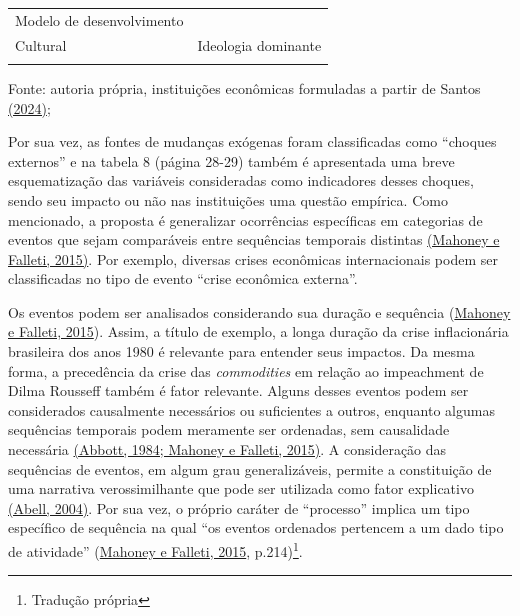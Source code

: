 \begin{longtable}[]{@{}
  >{\raggedright\arraybackslash}p{}
  >{\raggedright\arraybackslash}p{}@{}}
\begin{minipage}[b]{\linewidth}
Modelo de desenvolvimento
\end{minipage} \\
\begin{minipage}[b]{\linewidth}\raggedright
Cultural
\end{minipage} & \begin{minipage}[b]{\linewidth}\raggedright
Ideologia dominante
\end{minipage} \\
\midrule\noalign{}
\endhead
\bottomrule\noalign{}
\endlastfoot
\end{longtable}

Fonte: autoria própria, instituições econômicas formuladas a partir de
Santos \href{https://www.zotero.org/google-docs/?nTDqQq}{(2024)};

Por sua vez, as fontes de mudanças exógenas foram classificadas como
``choques externos'' e na tabela 8 (página 28-29) também é apresentada
uma breve esquematização das variáveis consideradas como indicadores
desses choques, sendo seu impacto ou não nas instituições uma questão
empírica. Como mencionado, a proposta é generalizar ocorrências
específicas em categorias de eventos que sejam comparáveis entre
sequências temporais distintas
\href{https://www.zotero.org/google-docs/?z1RPGn}{(Mahoney e Falleti,
2015)}. Por exemplo, diversas crises econômicas internacionais podem ser
classificadas no tipo de evento ``crise econômica externa''.

Os eventos podem ser analisados considerando sua duração e sequência
(\href{https://www.zotero.org/google-docs/?r6ykAY}{Mahoney e Falleti,
2015}). Assim, a título de exemplo, a longa duração da crise
inflacionária brasileira dos anos 1980 é relevante para entender seus
impactos. Da mesma forma, a precedência da crise das \emph{commodities}
em relação ao impeachment de Dilma Rousseff também é fator relevante.
Alguns desses eventos podem ser considerados causalmente necessários ou
suficientes a outros, enquanto algumas sequências temporais podem
meramente ser ordenadas, sem causalidade necessária
\href{https://www.zotero.org/google-docs/?ECkTS3}{(Abbott, 1984; Mahoney
e Falleti, 2015)}. A consideração das sequências de eventos, em algum
grau generalizáveis, permite a constituição de uma narrativa
verossimilhante que pode ser utilizada como fator explicativo
\href{https://www.zotero.org/google-docs/?93FtLL}{(Abell, 2004)}. Por
sua vez, o próprio caráter de ``processo'' implica um tipo específico de
sequência na qual ``os eventos ordenados pertencem a um dado tipo de
atividade'' (\href{https://www.zotero.org/google-docs/?loCeNV}{Mahoney e
Falleti, 2015}, p.214)\footnote{Tradução própria}.


